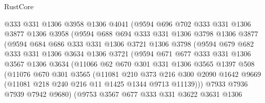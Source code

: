 \begin{lexlean}{RustCore}
\begin{coremodule}
                @333
                @331
                @1306
                @3958
                @1306
                @4041
                (@9594
                  @696
                  @702
                  @333
                  @331
                  @1306
                  @3877
                  @1306
                  @3958
                  (@9594
                    @688
                    @694
                    @333
                    @331
                    @1306
                    @3798
                    @1306
                    @3877
                    (@9594
                      @684
                      @686
                      @333
                      @331
                      @1306
                      @3721
                      @1306
                      @3798
                      (@9594
                        @679
                        @682
                        @333
                        @331
                        @1306
                        @3634
                        @1306
                        @3721
                        (@9594
                          @671
                          @677
                          @333
                          @331
                          @1306
                          @3567
                          @1306
                          @3634
                          (@11066
                            @62
                            @670
                            @301
                            @331
                            @1306
                            @3565
                            @1397
                            @508
                            (@11076
                              @670
                              @301
                              @3565
                              (@11081
                                @210
                                @373
                                @216
                                @300
                                @2090
                                @1642
                                @9669
                                (@11081 @218 @240 @216 @11 @1425 @1344 @9713 @11139)))
                            @7933
                            @7936
                            @7939
                            @7942
                            @9680)
                          (@9753
                            @3567
                            @677
                            @333
                            @331
                            @3622
                            @3631
                            @1306

\end{coremodule}
\end{lexlean}

